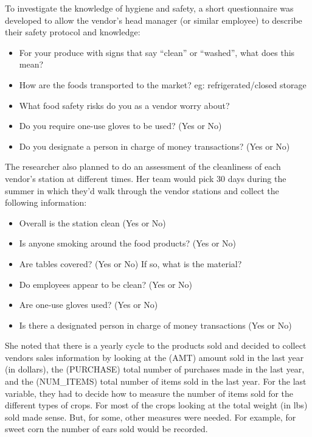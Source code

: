 \documentclass[
]{book}
\providecommand{\tightlist}{%
  \setlength{\itemsep}{0pt}\setlength{\parskip}{0pt}}
\theoremstyle{definition}
\theoremstyle{definition}
\theoremstyle{definition}
\theoremstyle{remark}
\begin{document}
To investigate the knowledge of hygiene and safety, a short questionnaire was developed to allow the vendor's head manager (or similar employee) to describe their safety protocol and knowledge:

\begin{itemize}
\tightlist
\item
  For your produce with signs that say ``clean'' or ``washed'', what does this mean?
\item
  How are the foods transported to the market? eg: refrigerated/closed storage\\
\item
  What food safety risks do you as a vendor worry about?\\
\item
  Do you require one-use gloves to be used? (Yes or No)\\
\item
  Do you designate a person in charge of money transactions? (Yes or No)
\end{itemize}

The researcher also planned to do an assessment of the cleanliness of each vendor's station at different times. Her team would pick 30 days during the summer in which they'd walk through the vendor stations and collect the following information:

\begin{itemize}
\tightlist
\item
  Overall is the station clean (Yes or No)\\
\item
  Is anyone smoking around the food products? (Yes or No)\\
\item
  Are tables covered? (Yes or No) If so, what is the material?\\
\item
  Do employees appear to be clean? (Yes or No)\\
\item
  Are one-use gloves used? (Yes or No)\\
\item
  Is there a designated person in charge of money transactions (Yes or No)
\end{itemize}

She noted that there is a yearly cycle to the products sold and decided to collect vendors sales information by looking at the (AMT) amount sold in the last year (in dollars), the (PURCHASE) total number of purchases made in the last year, and the (NUM\_ITEMS) total number of items sold in the last year. For the last variable, they had to decide how to measure the number of items sold for the different types of crops. For most of the crops looking at the total weight (in lbs) sold made sense. But, for some, other measures were needed. For example, for sweet corn the number of ears sold would be recorded.
\end{document}
